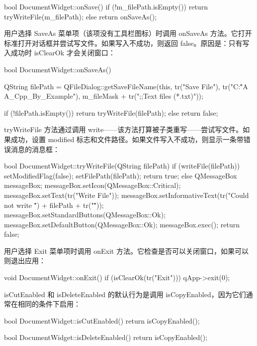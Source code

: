 \begin{codebox}
bool DocumentWidget::onSave() {
  if (!m_filePath.isEmpty()) {
    return tryWriteFile(m_filePath);
  }
  else {
    return onSaveAs();
  }
}
\end{codebox}

用户选择 SaveAs 菜单项（该项没有工具栏图标）时调用 onSaveAs 方法。它打开标准打开对话框并尝试写文件。如果写入不成功，则返回 false。原因是：只有写入成功时 isClearOk 才会关闭窗口：

\begin{codebox}
bool DocumentWidget::onSaveAs() {
  QString filePath =
          QFileDialog::getSaveFileName(this, tr("Save File"),
               tr("C:\Users\Stefan\Documents\"
                  "A A_Cpp_By_Example\Draw"),
            m_fileMask + tr(";;Text files (*.txt)"));

  if (!filePath.isEmpty()) {
    return tryWriteFile(filePath);
  }
  else {
    return false;
  }
}
\end{codebox}

tryWriteFile 方法通过调用 write——该方法打算被子类重写——尝试写文件。如果成功，设置 modified 标志和文件路径。如果文件写入不成功，则显示一条带错误消息的消息框：

\begin{codebox}
bool DocumentWidget::tryWriteFile(QString filePath) {
  if (writeFile(filePath)) {
    setModifiedFlag(false);
    setFilePath(filePath);
    return true;
  }
  else {
    QMessageBox messageBox;
    messageBox.setIcon(QMessageBox::Critical);
    messageBox.setText(tr("Write File"));
    messageBox.setInformativeText(tr("Could not write \"") +
                                  filePath  + tr("\""));
    messageBox.setStandardButtons(QMessageBox::Ok);
    messageBox.setDefaultButton(QMessageBox::Ok);
    messageBox.exec();
    return false;
  }
}
\end{codebox}

用户选择 Exit 菜单项时调用 onExit 方法。它检查是否可以关闭窗口，如果可以则退出应用：

\begin{codebox}
void DocumentWidget::onExit() {
  if (isClearOk(tr("Exit"))) {
    qApp->exit(0);
  }
}
\end{codebox}

isCutEnabled 和 isDeleteEnabled 的默认行为是调用 isCopyEnabled，因为它们通常在相同的条件下启用：

\begin{codebox}
bool DocumentWidget::isCutEnabled() {
  return isCopyEnabled();
}

bool DocumentWidget::isDeleteEnabled() {
  return isCopyEnabled();
}
\end{codebox}

